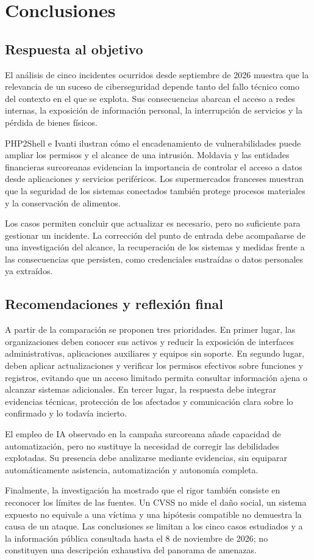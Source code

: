 \chapter{Conclusiones}
\label{chap:conclusiones}

\section{Respuesta al objetivo}
El análisis de cinco incidentes ocurridos desde septiembre
de 2026 muestra que la relevancia de un suceso de
ciberseguridad depende tanto del fallo técnico como
del contexto en el que se explota. Sus consecuencias
abarcan el acceso a redes internas, la exposición
de información personal, la interrupción de servicios
y la pérdida de bienes físicos.

PHP2Shell e Ivanti ilustran cómo el encadenamiento
de vulnerabilidades puede ampliar los permisos
y el alcance de una intrusión. Moldavia y las entidades
financieras surcoreanas evidencian la importancia
de controlar el acceso a datos desde aplicaciones
y servicios periféricos. Los supermercados franceses
muestran que la seguridad de los sistemas conectados
también protege procesos materiales y la conservación
de alimentos.

Los casos permiten concluir que actualizar es necesario,
pero no suficiente para gestionar un incidente.
La corrección del punto de entrada debe acompañarse
de una investigación del alcance, la recuperación
de los sistemas y medidas frente a las consecuencias
que persisten, como credenciales sustraídas
o datos personales ya extraídos.

\section{Recomendaciones y reflexión final}
A partir de la comparación se proponen tres prioridades.
En primer lugar, las organizaciones deben conocer
sus activos y reducir la exposición de interfaces
administrativas, aplicaciones auxiliares y equipos
sin soporte. En segundo lugar, deben aplicar
actualizaciones y verificar los permisos efectivos
sobre funciones y registros, evitando que un acceso
limitado permita consultar información ajena
o alcanzar sistemas adicionales. En tercer lugar,
la respuesta debe integrar evidencias técnicas,
protección de los afectados y comunicación clara
sobre lo confirmado y lo todavía incierto.

El empleo de IA observado en la campaña surcoreana
añade capacidad de automatización, pero no sustituye
la necesidad de corregir las debilidades explotadas.
Su presencia debe analizarse mediante evidencias,
sin equiparar automáticamente asistencia,
automatización y autonomía completa.

Finalmente, la investigación ha mostrado que
el rigor también consiste en reconocer los límites
de las fuentes. Un CVSS no mide el daño social,
un sistema expuesto no equivale a una víctima
y una hipótesis compatible no demuestra la causa
de un ataque. Las conclusiones se limitan a los
cinco casos estudiados y a la información pública
consultada hasta el 8 de noviembre de 2026;
no constituyen una descripción exhaustiva
del panorama de amenazas.